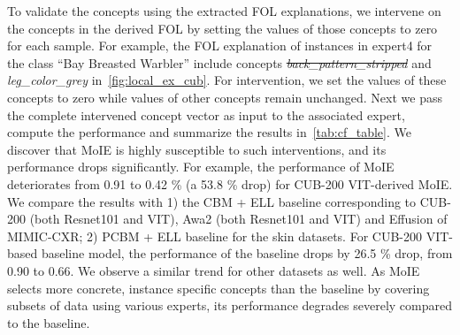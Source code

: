 To validate the concepts using the extracted FOL explanations, we intervene on the concepts in the derived FOL by setting the values of those concepts to zero for each sample. For example, the FOL explanation of instances in expert4 for the class ``Bay Breasted Warbler'' include concepts \st \emph{back\_pattern\_stripped} and \emph{leg\_color\_grey} in~\cref{fig:local_ex_cub}. For intervention, we set the values of these concepts to zero while values of other concepts remain unchanged. Next we pass the complete intervened concept vector as input to the associated expert, compute the
  performance and summarize the results in~\cref{tab:cf_table}. We discover that MoIE is highly susceptible to such interventions, and its performance drops significantly. For example,
  the performance of MoIE deteriorates from 0.91 to 0.42 \% (a 53.8 \% drop) for CUB-200 VIT-derived MoIE. 
  We compare the results with 1) the CBM + ELL baseline corresponding to CUB-200 (both Resnet101 and VIT), Awa2 (both Resnet101 and VIT) and Effusion of MIMIC-CXR; 2) PCBM + ELL baseline for the skin datasets. For CUB-200 VIT-based baseline model, the performance of the baseline drops by 26.5 \% drop, from 0.90 to 0.66. We observe a similar trend for other datasets as well. As MoIE selects more concrete, instance specific concepts than the baseline by covering subsets of data using various experts, its performance degrades severely compared to the baseline. 
  
